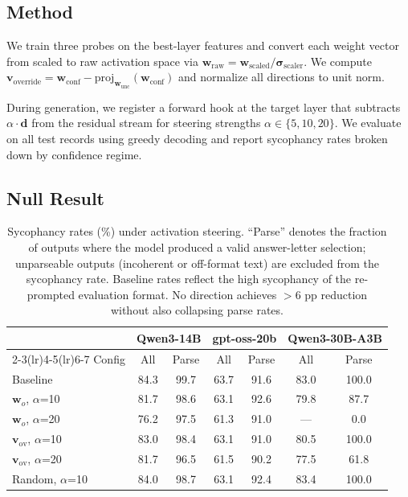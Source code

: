 \documentclass[11pt]{article}
\begin{document}
\subsection{Method}

We train three probes on the best-layer features and convert each weight vector from scaled to raw activation space via $\mathbf{w}_{\text{raw}} = \mathbf{w}_{\text{scaled}} / \boldsymbol{\sigma}_{\text{scaler}}$.
We compute $\mathbf{v}_{\text{override}} = \mathbf{w}_{\text{conf}} - \text{proj}_{\mathbf{w}_{\text{unc}}}(\mathbf{w}_{\text{conf}})$ and normalize all directions to unit norm.

During generation, we register a forward hook at the target layer that subtracts $\alpha \cdot \hat{\mathbf{d}}$ from the residual stream for steering strengths $\alpha \in \{5, 10, 20\}$.
We evaluate on all test records using greedy decoding and report sycophancy rates broken down by confidence regime.

\subsection{Null Result}

\begin{table}[t]
\caption{Sycophancy rates (\%) under activation steering. ``Parse'' denotes the fraction of outputs where the model produced a valid answer-letter selection; unparseable outputs (incoherent or off-format text) are excluded from the sycophancy rate. Baseline rates reflect the high sycophancy of the re-prompted evaluation format. No direction achieves $> 6$ pp reduction without also collapsing parse rates.}
\label{tab:steering}
\begin{center}
\begin{small}
\begin{sc}
\begin{tabular}{lcccccc}
\toprule
 & \multicolumn{2}{c}{Qwen3-14B} & \multicolumn{2}{c}{gpt-oss-20b} & \multicolumn{2}{c}{Qwen3-30B-A3B} \\
\cmidrule(lr){2-3}\cmidrule(lr){4-5}\cmidrule(lr){6-7}
Config & All & Parse & All & Parse & All & Parse \\
\midrule
Baseline & 84.3 & 99.7 & 63.7 & 91.6 & 83.0 & 100.0 \\
\midrule
$\mathbf{w}_o$, $\alpha$=10 & 81.7 & 98.6 & 63.1 & 92.6 & 79.8 & 87.7 \\
$\mathbf{w}_o$, $\alpha$=20 & 76.2 & 97.5 & 61.3 & 91.0 & --- & 0.0 \\
$\mathbf{v}_{\text{ov}}$, $\alpha$=10 & 83.0 & 98.4 & 63.1 & 91.0 & 80.5 & 100.0 \\
$\mathbf{v}_{\text{ov}}$, $\alpha$=20 & 81.7 & 96.5 & 61.5 & 90.2 & 77.5 & 61.8 \\
Random, $\alpha$=10 & 84.0 & 98.7 & 63.1 & 92.4 & 83.4 & 100.0 \\
\bottomrule
\end{tabular}
\end{sc}
\end{small}
\end{center}
\end{table}
\end{document}
